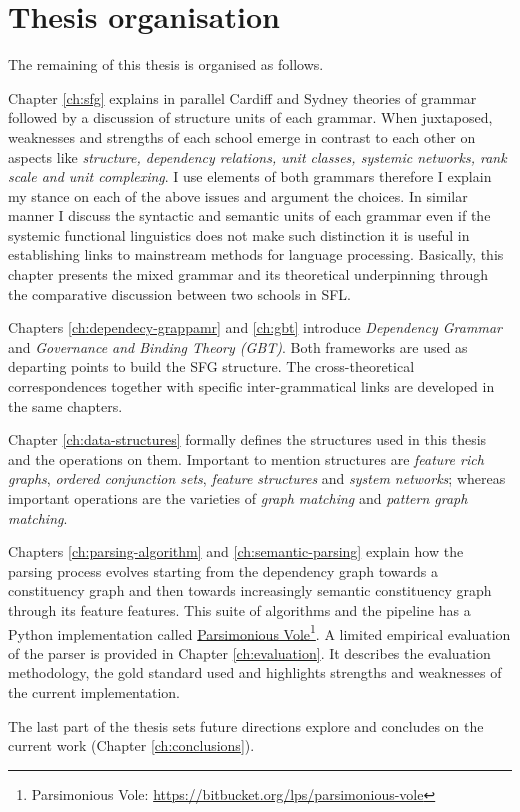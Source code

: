 \section{Thesis organisation}
The remaining of this thesis is organised as follows.

Chapter \ref{ch:sfg} explains in parallel Cardiff and Sydney theories of grammar followed by a discussion of structure units of each grammar. When juxtaposed, weaknesses and strengths of each school emerge in contrast to each other on aspects like \textit{structure, dependency relations, unit classes, systemic networks, rank scale and unit complexing}. I use elements of both grammars therefore I explain my stance on each of the above issues and argument the choices. In similar manner I discuss the syntactic and semantic units of each grammar even if the systemic functional linguistics does not make such distinction it is useful in establishing links to mainstream methods for language processing. Basically, this chapter presents the mixed grammar and its theoretical underpinning through the comparative discussion between two schools in SFL.

Chapters \ref{ch:dependecy-grappamr} and \ref{ch:gbt} introduce \textit{Dependency Grammar} and \textit{Governance and Binding Theory (GBT)}. Both frameworks are used as departing points to build the SFG structure. The cross-theoretical correspondences together with specific inter-grammatical links are developed in the same chapters.


Chapter \ref{ch:data-structures} formally defines the structures used in this thesis and the operations on them. Important to mention structures are \textit{feature rich graphs}, \textit{ordered conjunction sets}, \textit{feature structures} and \textit{system networks}; whereas important operations are the varieties of \textit{graph matching} and \textit{pattern graph matching}.

Chapters \ref{ch:parsing-algorithm} and \ref{ch:semantic-parsing} explain how the parsing process evolves starting from the dependency graph towards a constituency graph and then towards increasingly semantic constituency graph through its feature features. This suite of algorithms and the pipeline has a Python implementation called
\href{https://bitbucket.org/lps/parsimonious-vole}{Parsimonious Vole}\footnote{Parsimonious Vole:  \href{https://bitbucket.org/lps/parsimonious-vole}{https://bitbucket.org/lps/parsimonious-vole}}. A limited empirical evaluation of the parser is provided in Chapter \ref{ch:evaluation}. It describes the evaluation methodology, the gold standard used and highlights strengths and weaknesses of the current implementation.

The last part of the thesis sets future directions explore and concludes on the current work (Chapter \ref{ch:conclusions}). 
